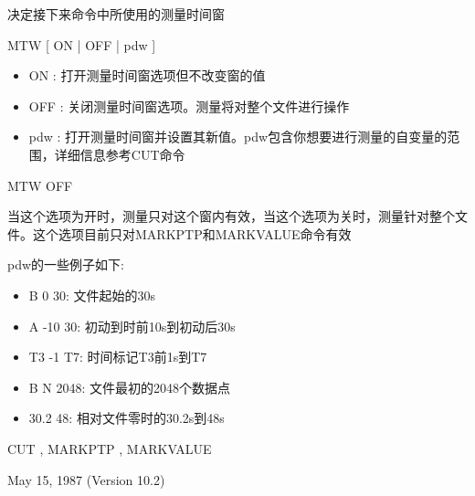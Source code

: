 \label{cmd:mtw}

决定接下来命令中所使用的测量时间窗

MTW [ ON | OFF | pdw ]

\begin{itemize}
\item ON : 打开测量时间窗选项但不改变窗的值 
\item OFF : 关闭测量时间窗选项。测量将对整个文件进行操作 
\item pdw : 打开测量时间窗并设置其新值。pdw包含你想要进行测量的自变量的范围，详细信息参考CUT命令 
\end{itemize}

MTW OFF

当这个选项为开时，测量只对这个窗内有效，当这个选项为关时，测量针对整个文件。这个选项目前只对MARKPTP和MARKVALUE命令有效

pdw的一些例子如下:
\begin{itemize}
\item B 0 30: 文件起始的30s
\item A -10 30: 初动到时前10s到初动后30s
\item T3 -1 T7: 时间标记T3前1s到T7
\item B N 2048: 文件最初的2048个数据点
\item 30.2 48: 相对文件零时的30.2s到48s
\end{itemize}

CUT , MARKPTP , MARKVALUE

May 15, 1987 (Version 10.2)
